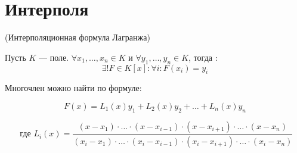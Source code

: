 \DeclareRobustCommand{\divby}{%
  \mathrel{\vbox{\baselineskip.65ex\lineskiplimit0pt\hbox{.}\hbox{.}\hbox{.}}}%
}


\section{Интерполя}


\begin{theorem} (Интерполяционная формула Лагранжа)
  
  Пусть $K$ --- поле. $\forall x_1, \ldots, x_n \in K$ и $\forall y_1, \ldots, y_n \in K$, тогда : 
  $$\exists! F \in K[x]: \forall i: F(x_i) = y_i$$
  
  Многочлен можно найти по формуле:

  $$F(x) = L_1(x)y_1 + L_2(x)y_2 + \ldots + L_n(x)y_n$$

  $$\text{ где } L_i(x) =\frac{(x - x_1) \cdot \ldots \cdot (x - x_{i-1}) \cdot (x - x_{i+1}) \cdot \ldots \cdot (x - x_n)}{(x_i - x_1) \cdot \ldots \cdot (x_i - x_{i-1}) \cdot (x_i - x_{i+1}) \cdot \ldots \cdot (x_i - x_n)}$$
\end{theorem}


